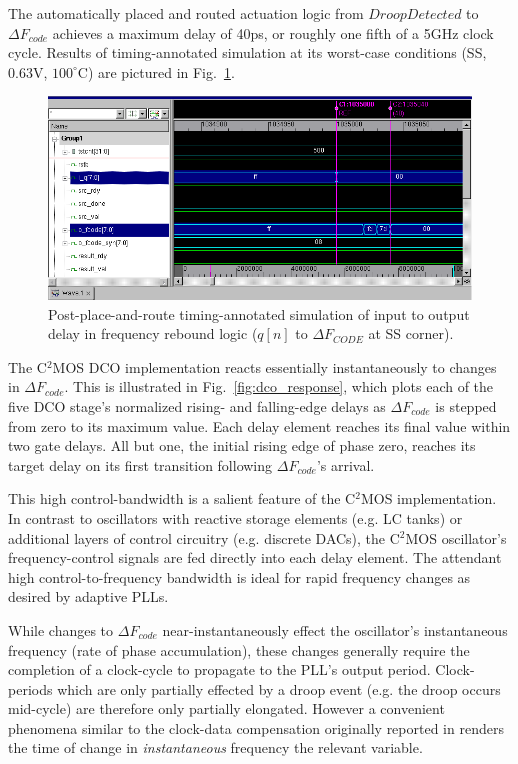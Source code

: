 \documentclass[twoside,9pt,journal,letterpage]{IEEEtran}
\begin{document}
The automatically placed and routed actuation logic from $DroopDetected$ to $\Delta F_{code}$ achieves a maximum delay of 40ps, or roughly one fifth of a 5GHz clock cycle. Results of timing-annotated simulation at its worst-case conditions (SS, 0.63V, $100^{\circ}$C) are pictured in Fig.\ \ref{fig:freqreboundctrl_postpandr_timing}. 

\vspace{-7pt}
\begin{figure}[h]
	\centering
	\includegraphics[width=\columnwidth]{fig_freqreboundctrl_postpandr_timing}
	\caption{Post-place-and-route timing-annotated simulation of input to output delay in frequency rebound logic ($q[n]$ to $\Delta F_{CODE}$ at SS corner).}
	\label{fig:freqreboundctrl_postpandr_timing}
\end{figure}
\vspace{-5pt}

The C$^2$MOS DCO implementation reacts essentially instantaneously to changes in $\Delta F_{code}$. This is illustrated in Fig.\ \ref{fig:dco_response}, which plots each of the five DCO stage's normalized rising- and falling-edge delays as $\Delta F_{code}$ is stepped from zero to its maximum value. Each delay element reaches its final value within two gate delays. All but one, the initial rising edge of phase zero, reaches its target delay on its first transition following $\Delta F_{code}$'s arrival. 

This high control-bandwidth is a salient feature of the C$^2$MOS implementation. In contrast to oscillators with reactive storage elements (e.g. LC tanks) or additional layers of control circuitry (e.g. discrete DACs), the C$^2$MOS oscillator's frequency-control signals are fed directly into each delay element. The attendant high control-to-frequency bandwidth is ideal for rapid frequency changes as desired by adaptive PLLs. 

While changes to $\Delta F_{code}$ near-instantaneously effect the oscillator's instantaneous frequency (rate of phase accumulation), these changes generally require the completion of a clock-cycle to propagate to the PLL's output period. Clock-periods which are only partially effected by a droop event (e.g. the droop occurs mid-cycle) are therefore only partially elongated. However a convenient phenomena similar to the clock-data compensation originally reported in \cite{wong2006enhancing} renders the time of change in \textit{instantaneous} frequency the relevant variable. 
\end{document}
